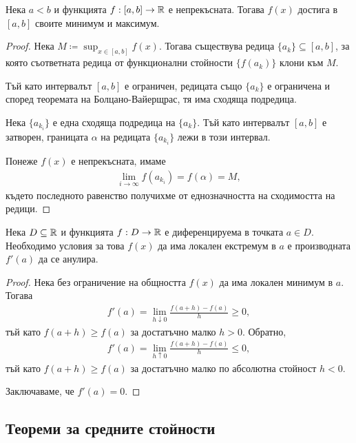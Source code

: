 \documentclass[numbers=endperiod, bibliography=totocnumbered]{scrartcl}
\begin{document}
\begin{theorem}[Вайерщрас]
  Нека \( a < b \) и функцията \( f: [a, b] \to \mathbb{R} \) е непрекъсната. Тогава \( f(x) \) достига в \( [a, b] \) своите минимум и максимум.
\end{theorem}
\begin{proof}
  Нека \( M \coloneqq \sup_{x \in [a, b]} f(x) \). Тогава съществува редица \( \{ a_k \} \subseteq [a, b] \), за която съответната редица от функционални стойности \( \{ f(a_k) \} \) клони към \( M \).

  Тъй като интервалът \( [a, b] \) е ограничен, редицата също \( \{ a_k \} \) е ограничена и според теоремата на Болцано-Вайерщрас, тя има сходяща подредица.

  Нека \( \{ a_{k_i} \} \) е една сходяща подредица на \( \{ a_k \} \). Тъй като интервалът \( [a, b] \) е затворен, границата \( \alpha \) на редицата \( \{ a_{k_i} \} \) лежи в този интервал.

  Понеже \( f(x) \) е непрекъсната, имаме
  \begin{align*}
    \lim_{i \to \infty} f(a_{k_i}) = f(\alpha) = M,
  \end{align*}
  където последното равенство получихме от еднозначността на сходимостта на редици.
\end{proof}

\begin{theorem}[Ферма]
  Нека \( D \subseteq \mathbb{R} \) и функцията \( f: D \to \mathbb{R} \) е диференцируема в точката \( a \in D \). Необходимо условия за това \( f(x) \) да има локален екстремум в \( a \) е производната \( f'(a) \) да се анулира.
\end{theorem}
\begin{proof}
  Нека без ограничение на общността \( f(x) \) да има локален минимум в \( a \). Тогава
  \begin{align*}
    f'(a) = \lim_{h \downarrow 0} \frac {f(a+h) - f(a)} h \geq 0,
  \end{align*}
  тъй като \( f(a+h) \geq f(a) \) за достатъчно малко \( h > 0 \). Обратно,
  \begin{align*}
    f'(a) = \lim_{h \uparrow 0} \frac {f(a+h) - f(a)} h \leq 0,
  \end{align*}
  тъй като \( f(a+h) \geq f(a) \) за достатъчно малко по абсолютна стойност \( h < 0 \).

  Заключаваме, че \( f'(a) = 0 \).
\end{proof}

\subsection{Теореми за средните стойности}
\end{document}
